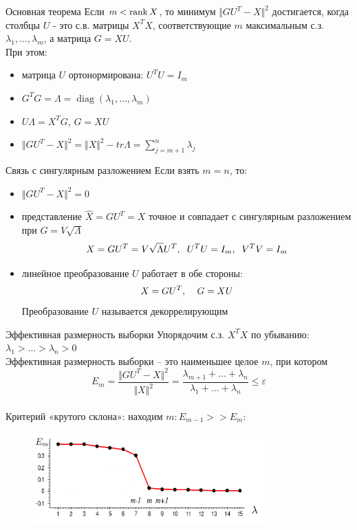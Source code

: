 \documentclass[10pt]{beamer}
\begin{document}
\begin{frame}{Основная теорема}
	Если $m < \operatorname{rank} X$, то минимум $\Vert GU^T - X \Vert^2$ достигается, когда столбцы $U$ - это с.в. матрицы $X^TX$, соответствующие $m$ максимальным с.з. $\lambda_1,\dots, \lambda_m$, а матрица $G = XU$.\\
	\bigbreak
	\pause
	При этом:\\
	\begin{itemize}
		\item матрица $U$ ортонормирована: $U^TU = I_m$
		\item $G^TG = \Lambda = \operatorname{diag}(\lambda_1, \dots, \lambda_m)$
		\item $U\Lambda = X^TG$, \qquad  $G = XU$
		\item $\Vert GU^T - X \Vert^2 = \Vert X \Vert^2 - tr \Lambda = \sum\limits_{j=m+1}^n \lambda_j$
	\end{itemize}
\end{frame}

\begin{frame}{Связь с сингулярным разложением}
	Если взять $m = n$, то:\\
	\begin{itemize}[<+->]
	\item $\Vert GU^T - X \Vert^2 = 0$
	\item представление $\hat{X} = GU^T = X$ точное и совпадает с сингулярным разложением при $G = V \sqrt{\Lambda}$
	$$X = GU^T = V\sqrt{\Lambda}U^T, \hspace{2mm} U^TU = I_m, \hspace{2mm} V^TV = I_m$$
	\item линейное преобразование $U$ работает в обе стороны:\\
	$$X = GU^T, \hspace{4mm} G=XU$$
	Преобразование $U$ называется декоррелирующим
	\end{itemize}
\end{frame}

\begin{frame}{Эффективная размерность выборки}
	Упорядочим с.з. $X^TX$ по убыванию: $\lambda_1 > \dots > \lambda_n > 0$\\
	Эффективная размерность выборки -- это наименьшее целое $m$, при котором\\
	$$E_m = \frac{\Vert GU^T - X \Vert^2}{\Vert X \Vert^2} = \frac{\lambda_{m+1} + \dots + \lambda_{n}}{\lambda_1 + \dots + \lambda_n} \leq \varepsilon$$\\
	\pause
	Критерий «крутого склона»: находим $m: E_{m-1} >> E_m$:
	\begin{figure}[htbp]
	  \includegraphics[height=100pt, keepaspectratio = true]{images/edge}
	\end{figure}
\end{frame}
\end{document}
